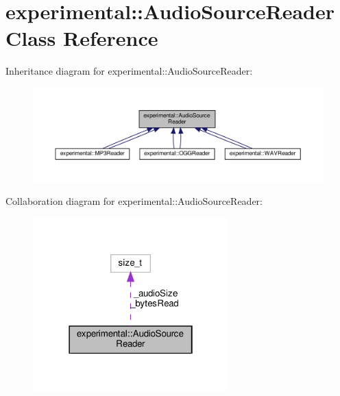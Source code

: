 \hypertarget{classexperimental_1_1AudioSourceReader}{}\section{experimental\+:\+:Audio\+Source\+Reader Class Reference}
\label{classexperimental_1_1AudioSourceReader}


Inheritance diagram for experimental\+:\+:Audio\+Source\+Reader\+:
\nopagebreak
\begin{figure}[H]
\begin{center}
\leavevmode
\includegraphics[width=350pt]{classexperimental_1_1AudioSourceReader__inherit__graph}
\end{center}
\end{figure}


Collaboration diagram for experimental\+:\+:Audio\+Source\+Reader\+:
\nopagebreak
\begin{figure}[H]
\begin{center}
\leavevmode
\includegraphics[width=214pt]{classexperimental_1_1AudioSourceReader__coll__graph}
\end{center}
\end{figure}
